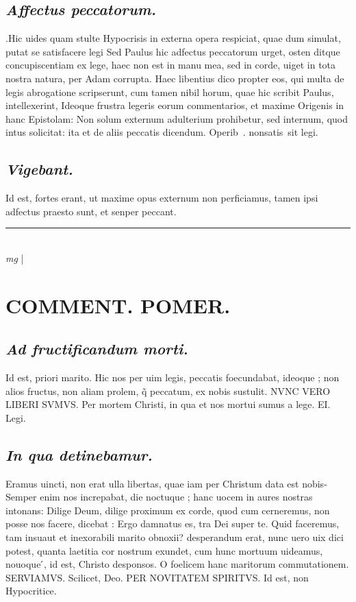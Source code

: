 \documentclass{article}
\begin{document}
\begin{pages}
\subsection*{\textit{Affectus peccatorum. }}\pstart .Hic uides quam stulte Hypocrisis in externa opera respiciat, quae dum simulat, putat se satisfacere legi Sed Paulus hic adfectus peccatorum urget, osten ditque concupiscentiam ex lege, haec non est in manu mea, sed in corde, uiget in tota nostra natura, per Adam corrupta. Haec libentius dico propter eos, qui multa de legis abrogatione scripserunt, cum tamen nibil horum, quae hic scribit Paulus, intellexerint, Ideoque frustra legeris eorum commentarios, et maxime Origenis in hanc Epistolam: Non solum externum adulterium prohibetur, sed internum, quod intus solicitat: ita et de aliis peccatis dicendum.  Operib . nonsatis sit legi.  \pend
{}
{}
\subsection*{\textit{Vigebant. }}\pstart Id est, fortes erant, ut maxime opus externum non perficiamus, tamen ipsi adfectus praesto sunt, et senper peccant.   \pend
\vspace{0.5cm}\noindent
\vspace{0.2cm}\rule{1cm}{0.2pt}\\ 
\hspace{0.2cm}\textit{mg}
\footnotesize 
\normalsize| 
\section*{COMMENT. POMER.  }
{}
\subsection*{\textit{Ad fructificandum morti. }}\pstart Id est, priori marito. Hic nos per uim legis, peccatis foecundabat, ideoque ; non alios fructus, non aliam prolem, q̃ peccatum, ex nobis sustulit. NVNC VERO LIBERI SVMVS. Per mortem Christi, in qua et nos mortui sumus a lege. EI. Legi.   \pend
{}
{}
\subsection*{\textit{In qua detinebamur. }}\pstart Eramus uincti, non erat ulla libertas, quae iam per Christum data est nobis-Semper enim nos increpabat, die noctuque ; hanc uocem in aures nostras intonans: Dilige Deum, dilige proximum ex corde, quod cum cerneremus, non posse nos facere, dicebat : Ergo damnatus es, tra Dei super te. Quid faceremus, tam insuaut et inexorabili marito obnoxii? desperandum erat, nunc uero uix dici potest, quanta laetitia cor nostrum exundet, cum hunc mortuum uideamus, nouoque ́, id est, Christo desponsos. O foelicem hanc maritorum commutationem. SERVIAMVS.   \pend\pstart Scilicet, Deo. PER NOVITATEM SPIRITVS. Id est, non Hypocritice.   \pend
{}
{}

\end{pages}
\end{document}
